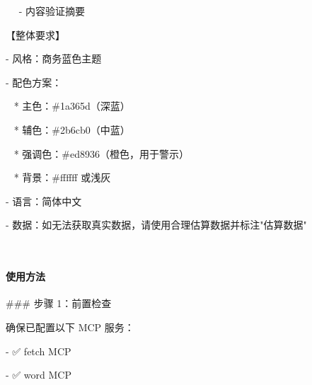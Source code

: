 \documentclass[
  american,
  chinese,
]{ctexart}
\begin{document}
\foreignlanguage{american}{{~~ }- }{\foreignlanguage{american}{内容验证摘要}}\foreignlanguage{american}{}

{【整体要求】}\foreignlanguage{american}{}

\foreignlanguage{american}{- }{风格：商务蓝色主题}\foreignlanguage{american}{}

\foreignlanguage{american}{- }{\foreignlanguage{american}{配色方案}}\foreignlanguage{american}{：}\foreignlanguage{american}{}

\foreignlanguage{american}{{~ }* }{\foreignlanguage{american}{主色}}\foreignlanguage{american}{：}\foreignlanguage{american}{\#1a365d}\foreignlanguage{american}{（深蓝）}\foreignlanguage{american}{}

\foreignlanguage{american}{{~ }* }{\foreignlanguage{american}{辅色}}\foreignlanguage{american}{：}\foreignlanguage{american}{\#2b6cb0}\foreignlanguage{american}{（中蓝）}\foreignlanguage{american}{}

\foreignlanguage{american}{{~ }* }{\foreignlanguage{american}{强调色}}\foreignlanguage{american}{：}\foreignlanguage{american}{\#ed8936}\foreignlanguage{american}{（橙色，用于警示）}\foreignlanguage{american}{}

\foreignlanguage{american}{{~ }}\foreignlanguage{american}{* }{背景：}\foreignlanguage{american}{\#ffffff }{或浅灰}\foreignlanguage{american}{}

\foreignlanguage{american}{- }{语言：简体中文}\foreignlanguage{american}{}

\foreignlanguage{american}{- }{数据：如无法获取真实数据，请使用合理估算数据并标注}\foreignlanguage{american}{"}{估算数据}\foreignlanguage{american}{"}

\foreignlanguage{american}{}

~

\paragraph{\texorpdfstring{{使用方法}\foreignlanguage{american}{}}{使用方法}}\label{ux4f7fux7528ux65b9ux6cd5-1}

\foreignlanguage{american}{\#\#\# }{步骤}\foreignlanguage{american}{ 1}{：前置检查}\foreignlanguage{american}{}

{确保已配置以下}\foreignlanguage{american}{ MCP }{服务：}\foreignlanguage{american}{}

\foreignlanguage{american}{- }\foreignlanguage{american}{✅}\foreignlanguage{american}{
fetch MCP}

\foreignlanguage{american}{- }\foreignlanguage{american}{✅}\foreignlanguage{american}{
word MCP}
\end{document}
